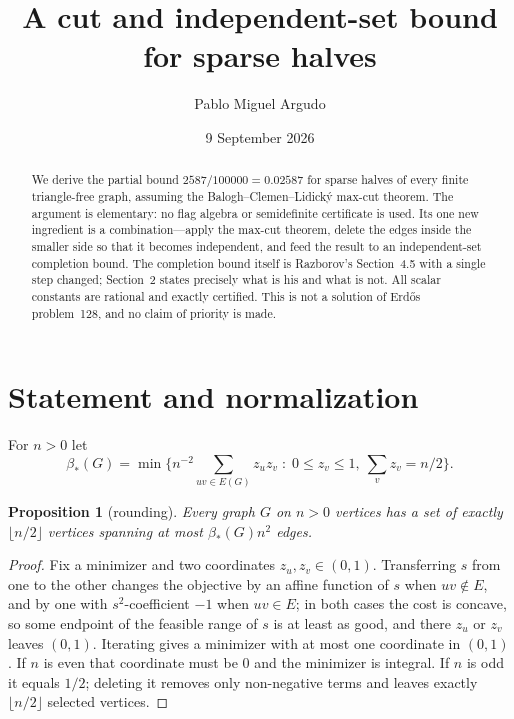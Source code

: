 \documentclass[11pt]{article}
\title{A cut and independent-set bound for sparse halves}
\author{Pablo Miguel Argudo}
\date{9 September 2026}
\newtheorem{proposition}[theorem]{Proposition}
\theoremstyle{remark}
\newcommand{\bh}{\beta_*}
\begin{document}
\maketitle
\begin{abstract}
We derive the partial bound $2587/100000=0.02587$ for sparse halves of every
finite triangle-free graph, assuming the Balogh--Clemen--Lidick\'y max-cut
theorem. The argument is elementary: no flag algebra or semidefinite
certificate is used. Its one new ingredient is a combination---apply the
max-cut theorem, delete the edges inside the smaller side so that it becomes
independent, and feed the result to an independent-set completion bound. The
completion bound itself is Razborov's Section~4.5 with a single step changed;
Section~2 states precisely what is his and what is not. All scalar constants
are rational and exactly certified. This is not a solution of Erd\H{o}s
problem~128, and no claim of priority is made.
\end{abstract}

\section{Statement and normalization}
For $n>0$ let
\[
 \bh(G)=\min\Big\{n^{-2}\!\!\sum_{uv\in E(G)}\!\!z_uz_v \;:\;
   0\le z_v\le 1,\ \sum_v z_v=n/2\Big\}.
\]

\begin{proposition}[rounding]\label{round}
Every graph $G$ on $n>0$ vertices has a set of exactly $\lfloor n/2\rfloor$
vertices spanning at most $\bh(G)n^2$ edges.
\end{proposition}
\begin{proof}
Fix a minimizer and two coordinates $z_u,z_v\in(0,1)$. Transferring $s$ from
one to the other changes the objective by an affine function of $s$ when
$uv\notin E$, and by one with $s^2$-coefficient $-1$ when $uv\in E$; in both
cases the cost is concave, so some endpoint of the feasible range of $s$ is at
least as good, and there $z_u$ or $z_v$ leaves $(0,1)$. Iterating gives a
minimizer with at most one coordinate in $(0,1)$. If $n$ is even that
coordinate must be $0$ and the minimizer is integral. If $n$ is odd it equals
$1/2$; deleting it removes only non-negative terms and leaves exactly
$\lfloor n/2\rfloor$ selected vertices.
\end{proof}
\end{document}
